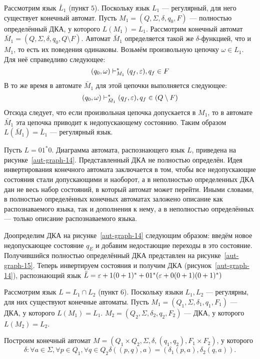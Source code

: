 Рассмотрим язык $\bar L_1$ (пункт $5$). Поскольку язык $L_1$ --- регулярный, для него существует конечный автомат. Пусть $M_1 = (Q,\Sigma, \delta, q_0, F)$ --- полностью определённый ДКА, у которого $L(M_1) = L_1$. Рассмотрим конечный автомат $\bar M_1 = (Q,\Sigma, \delta, q_0, Q \setminus F)$. Автомат $\bar M_1$ определяется такой же $\delta$-функцией, что и $M_1$, то есть их поведения одинаковы. Возьмём произвольную цепочку $\omega \in L_1$. Для неё справедливо следующее:
\[ (q_0, \omega) \vdash_{M_1}^* (q_f, \varepsilon), q_f \in F \]
В то же время в автомате $\bar M_1$ для этой цепочки выполняется следующее:
\[ (q_0, \omega) \vdash_{\bar M_1}^* (q_f, \varepsilon), q_f \in (Q \setminus F) \]
Отсюда следует, что если произвольная цепочка допускается в $M_1$, то в автомате $\bar M_1$ эта цепочка приводит к недопускающему состоянию. Таким образом $L(\bar M_1) = \bar L_1$ --- регулярный язык.

\begin{myexample}
Пусть $L = 01^*0$. Диаграмма автомата, распознающего язык $L$, приведена на рисунке~\ref{aut-graph-14}. Представленный ДКА не полностью определён. Идея инвертирования конечного автомата заключается в том, чтобы все недопускающие состояния стали допускающими и наоборот, а в неполностью определенных ДКА дан не весь набор состояний, в который автомат может перейти. Иными словами, в полностью определённых конечных автоматах заложено описание как распознаваемого языка, так и дополнения к нему, а в неполностью определённых --- только описание распознаваемого языка.

Доопределим ДКА на рисунке~\ref{aut-graph-14} следующим образом: введём новое недопускающее состояние $q_E$ и добавим недостающие переходы в это состояние. Получившийся полностью определённый ДКА представлен на рисунке~\ref{aut-graph-15}. Теперь инвертируем состояния и получим ДКА (рисунок~\ref{aut-graph-14}), распознающий язык $\bar L = \varepsilon + 1(0 + 1)^* + 01^*(\varepsilon + 0(0+1)(0+1)^*)$
\end{myexample}



Рассмотрим язык $L = L_1 \cap L_2$ (пункт $6$). Поскольку языки $L_1, L_2$ --- регулярны, для них существуют конечные автоматы. Пусть $M_1 = (Q_1,\Sigma, \delta_1, q_1, F_1)$ --- ДКА, у которого $L(M_1) = L_1$. $M_2 = (Q_2,\Sigma, \delta_2, q_2, F_2)$ --- ДКА, у которого $L(M_2) = L_2$.

Построим конечный автомат $M = (Q_1 \times Q_2,\Sigma, \delta, (q_1, q_2), F_1 \times F_2)$, у которого
\[ \delta: \forall a \in \Sigma, \forall p \in Q_1, \forall q \in Q_2 \delta((p, q), a) = (\delta_1(p,a), \delta_2(q,a)). \]

